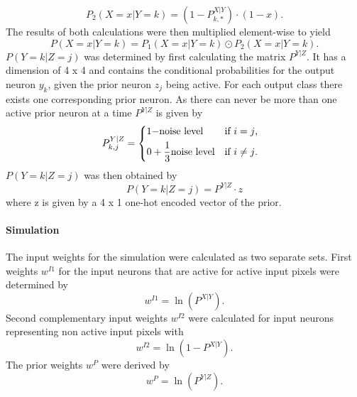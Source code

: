 \begin{equation}
\label{eqn:p2minusXvorausgesetztYMalX}
P_2(X = x|Y = k) = (1 - P^{X|Y}_{k,*}) \cdot (1 - x).
\end{equation}
The results of both calculations were then multiplied element-wise to yield
\begin{equation}
\label{eqn:pXvorausgesetztY}
P(X = x|Y = k) = P_1(X = x|Y = k) \odot P_2(X = x|Y = k).
\end{equation}
$P(Y=k|Z=j)$ was determined by first calculating the matrix $P^{Y|Z}$. It has a dimension of 4 x 4 and contains the conditional probabilities for the output neuron $y_k$, given the prior neuron $z_j$ being active. For each output class there exists one corresponding prior neuron. As there can never be more than one active prior neuron at a time $P^{Y|Z}$ is given by
\begin{equation}
\label{eqn:PYvorausgesetztZIf}
P_{k,j}^{Y|Z} = \begin{dcases*} 1 - $noise level$ & if $i = j$, \\
0 +  \frac{1}{3}  $noise level$ & \text{if $i \neq j$. } \end{dcases*}\end{equation} 
$P(Y=k|Z=j)$ was then obtained by
\begin{equation}
\label{eqn:pYvorausgesetztZ}
P(Y=k|Z=j) = P^{Y|Z} \cdot z
\end{equation}
where z is given by a 4 x 1 one-hot encoded vector of the prior.

\paragraph{Simulation}
The input weights for the simulation were calculated as two separate sets. First weights $w^{I1}$ for the input neurons that are active for active input pixels were determined by 
\begin{equation}
\label{eqn:1DWeights}
w^{I1} = \ln(P^{X|Y}).
\end{equation}
Second complementary input weights $w^{I2}$ were calculated for  input neurons representing non active input pixels with
\begin{equation}
\label{eqn:1DWeightsComplementary}
w^{I2} = \ln(1 - P^{X|Y}).
\end{equation} 
The prior weights $w^P$ were derived by 
\begin{equation}
\label{eqn:1DWeightsPrior}
w^P = \ln(P^{Y|Z}).
\end{equation}

